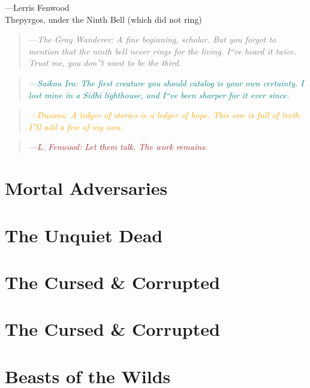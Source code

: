 \documentclass[10pt, twoside]{book}
\newcommand{\greyblock}[1]{%
  \begin{quote}
    \textcolor{gray}{\textit{---The Gray Wanderer: #1}}%
  \end{quote}%
}
\newcommand{\saikoublock}[1]{%
  \begin{quote}
    \textcolor{teal}{\textit{---Saikou Ira: #1}}%
  \end{quote}%
}
\newcommand{\dusanablock}[1]{%
  \begin{quote}
    \textcolor{orange}{\textit{---Dusana: #1}}%
  \end{quote}%
}
\newcommand{\lerrisblock}[1]{%
  \begin{quote}
    \textcolor{brown}{\textit{---L. Fenwood: #1}}%
  \end{quote}%
}
\begin{document}
---Lerris Fenwood\\
Thepyrgos, under the Ninth Bell (which did not ring)

\greyblock{A fine beginning, scholar. But you forgot to mention that the ninth bell never rings for the living. I``ve heard it twice. Trust me, you don''t want to be the third.}

\saikoublock{The first creature you should catalog is your own certainty. I lost mine in a Sidhi lighthouse, and I``ve been sharper for it ever since.}

\dusanablock{A ledger of stories is a ledger of hope. This one is full of teeth. I''ll add a few of my own.}

\lerrisblock{Let them talk. The work remains.}

\clearpage

\tableofcontents
\clearpage

\mainmatter

\chapter*{Mortal Adversaries}

\clearpage

\chapter*{The Unquiet Dead}

\clearpage

\chapter*{The Cursed \& Corrupted}

\clearpage

\chapter*{The Cursed \& Corrupted}

\clearpage

\chapter*{Beasts of the Wilds}

\clearpage

\end{document}
